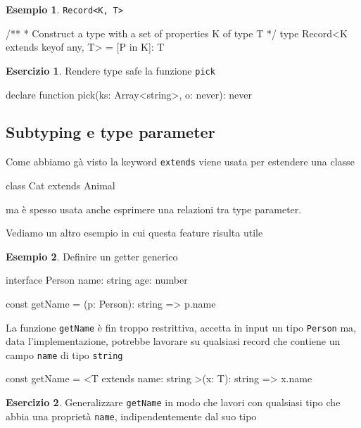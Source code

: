 \documentclass[12pt]{article}
\theoremstyle{definition}
\newtheorem{example}{Esempio}[subsection]
\newtheorem{exercise}{Esercizio}[subsection]
\newenvironment{code}
  {\vspace{0.5cm} \VerbatimEnvironment\begin{typescriptcode}}
  {\end{typescriptcode} \vspace{0.2cm}}
\begin{document}
\begin{example}
\texttt{Record<K, T>}

\begin{code}
/**
 * Construct a type with a set of properties K of type T
 */
type Record<K extends keyof any, T> = { [P in K]: T }
\end{code}
\end{example}

\begin{exercise}
Rendere type safe la funzione \texttt{pick}

\begin{code}
declare function pick(ks: Array<string>, o: never): never
\end{code}
\end{exercise}

\subsection{Subtyping e type parameter}

Come abbiamo gà visto la keyword \texttt{extends} viene usata per estendere una classe

\begin{code}
class Cat extends Animal {}
\end{code}

ma è spesso usata anche esprimere una relazioni tra type parameter.

Vediamo un altro esempio in cui questa feature risulta utile

\begin{example}
Definire un getter generico

\begin{code}
interface Person {
  name: string
  age: number
}

const getName = (p: Person): string => p.name
\end{code}

La funzione \texttt{getName} è fin troppo restrittiva, accetta in input un tipo \texttt{Person} ma, data l'implementazione,
potrebbe lavorare su qualsiasi record che contiene un campo \texttt{name} di tipo \texttt{string}

\begin{code}
const getName = <T extends { name: string }>(x: T): string =>
  x.name
\end{code}
\end{example}

\begin{exercise}
Generalizzare \texttt{getName} in modo che lavori con qualsiasi tipo che abbia una proprietà \texttt{name},
indipendentemente dal suo tipo
\end{exercise}
\end{document}
